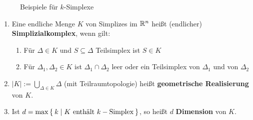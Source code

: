 \begin{figure}[ht]
    \centering

    \label{fig:k-simplexe}
    \caption{Beispiele für $k$-Simplexe}
\end{figure}


\begin{definition}%
    \begin{enumerate}[label=\alph*),ref=\thedefinition.\alph*]
        \item Eine endliche Menge $K$ von Simplizes im $\mathbb{R}^n$
              heißt (endlicher) \textbf{Simplizialkomplex},
              wenn gilt:
            \begin{enumerate}[label=(\roman*),ref=\theenumii.\roman*]
                \item Für $\Delta \in K$ und $S \subseteq \Delta$ Teilsimplex
                      ist $S \in K$
                \item Für $\Delta_1, \Delta_2 \in K$ ist 
                      $\Delta_1 \cap \Delta_2$ leer oder ein 
                        Teilsimplex von $\Delta_1$ und von 
                      $\Delta_2$ \label{def:simplizialkomplex.ii}
            \end{enumerate}
        \item $|K| := \bigcup_{\Delta \in K} \Delta$ (mit Teilraumtopologie)
              heißt \textbf{geometrische Realisierung}
              von $K$.
        \item Ist $d = \max \Set{ k | K \text{ enthält } k-\text{Simplex}}$,
              so heißt $d$ \textbf{Dimension} von
              $K$.
    \end{enumerate}
\end{definition}

